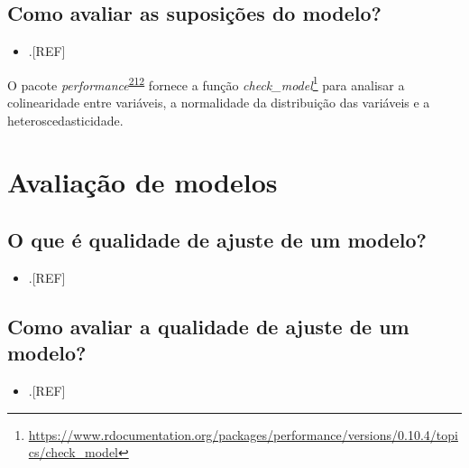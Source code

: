 \documentclass[
  a4paper,
]{book}
\providecommand{\tightlist}{%
  \setlength{\itemsep}{0pt}\setlength{\parskip}{0pt}}
\renewcommand{\href}[2]{#2\footnote{\url{#1}}}
\newenvironment{infobox}[1]
  {
  \begin{itemize}
  \renewcommand{\labelitemi}{
    \raisebox{-.7\height}[0pt][0pt]{
      {\setkeys{Gin}{width=3em,keepaspectratio}
        \texttt{[image: \#1]}}
    }
  }
  \setlength{\fboxsep}{1em}
  \begin{blackbox}
  \item
  }
  {
  \end{blackbox}
  \end{itemize}
  }
\begin{document}
\hypertarget{como-avaliar-as-suposiuxe7uxf5es-do-modelo}{%
\subsection{Como avaliar as suposições do modelo?}\label{como-avaliar-as-suposiuxe7uxf5es-do-modelo}}

\begin{itemize}
\tightlist
\item
  .{[}REF{]}
\end{itemize}

\begin{infobox}{images/Rlogo}
O pacote \emph{performance}\textsuperscript{\protect\hyperlink{ref-performance}{212}} fornece a função \href{https://www.rdocumentation.org/packages/performance/versions/0.10.4/topics/check_model}{\emph{check\_model}} para analisar a colinearidade entre variáveis, a normalidade da distribuição das variáveis e a heteroscedasticidade.

\end{infobox}

\hypertarget{avaliacao-modelo}{%
\section{Avaliação de modelos}\label{avaliacao-modelo}}

\hypertarget{o-que-uxe9-qualidade-de-ajuste-de-um-modelo}{%
\subsection{O que é qualidade de ajuste de um modelo?}\label{o-que-uxe9-qualidade-de-ajuste-de-um-modelo}}

\begin{itemize}
\tightlist
\item
  .{[}REF{]}
\end{itemize}

\hypertarget{como-avaliar-a-qualidade-de-ajuste-de-um-modelo}{%
\subsection{Como avaliar a qualidade de ajuste de um modelo?}\label{como-avaliar-a-qualidade-de-ajuste-de-um-modelo}}

\begin{itemize}
\tightlist
\item
  .{[}REF{]}
\end{itemize}
\end{document}
